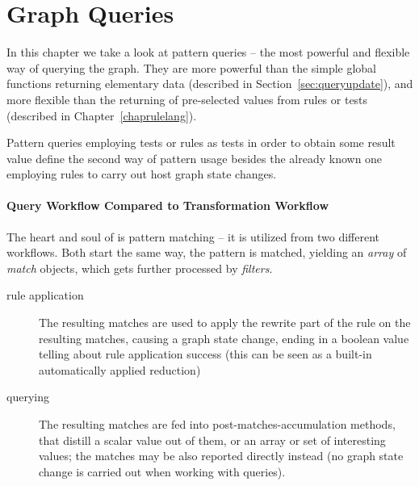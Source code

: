 \chapter{Graph Queries}\label{cha:graphquery}

In this chapter we take a look at pattern queries -- the most powerful and flexible way of querying the graph.
They are more powerful than the simple global functions returning elementary data (described in Section~\ref{sec:queryupdate}),
and more flexible than the returning of pre-selected values from rules or tests (described in Chapter~\ref{chaprulelang}).

Pattern queries employing tests or rules as tests in order to obtain some result value define the second way of pattern usage besides the already known one employing rules to carry out host graph state changes.

\subsubsection*{Query Workflow Compared to Transformation Workflow}


The heart and soul of \GrG{} is pattern matching -- it is utilized from two different workflows.
Both start the same way, the pattern is matched, yielding an \emph{array} of \emph{match} objects, which gets further processed by \emph{filters}.
\begin{description}
	\item[rule application] The resulting matches are used to apply the rewrite part of the rule on the resulting matches, causing a graph state change, ending in a boolean value telling about rule application success (this can be seen as a built-in automatically applied reduction) %
	\item[querying] The resulting matches are fed into post-matches-accumulation methods, that distill a scalar value out of them, or an array or set of interesting values; the matches may be also reported directly instead (no graph state change is carried out when working with queries).
\end{description}

